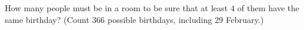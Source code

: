 How many people must be in a room to be sure that at least $4$ of them have the same birthday? (Count $366$ possible birthdays, including 29 February.)

